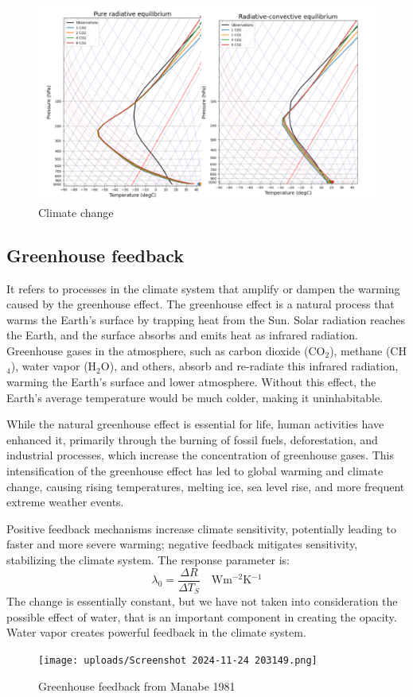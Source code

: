 \begin{figure}[htpb]
	\centering
	\includegraphics[width=0.5\linewidth]{upload/Screenshot 2024-11-24 202614.png}
	\caption{Climate change}

\end{figure}
\subsection{Greenhouse feedback}
It refers to processes in the climate system that amplify or dampen the warming caused by the greenhouse effect.  The greenhouse effect is a natural process that warms the Earth’s surface by trapping heat from the Sun. Solar radiation reaches the Earth, and the surface absorbs and emits heat as infrared radiation. Greenhouse gases in the atmosphere, such as carbon dioxide (CO$_2$), methane (CH$_4$), water vapor (H$_2$O), and others, absorb and re-radiate this infrared radiation, warming the Earth's surface and lower atmosphere. Without this effect, the Earth's average temperature would be much colder, making it uninhabitable.

While the natural greenhouse effect is essential for life, human activities have enhanced it, primarily through the burning of fossil fuels, deforestation, and industrial processes, which increase the concentration of greenhouse gases. This intensification of the greenhouse effect has led to global warming and climate change, causing rising temperatures, melting ice, sea level rise, and more frequent extreme weather events.

Positive feedback mechanisms increase climate sensitivity, potentially leading to faster and more severe warming; negative feedback mitigates sensitivity, stabilizing the climate system.
The response parameter is:
\begin{equation}
	\lambda_0=\frac{\Delta R}{\Delta T_S}\quad \text{Wm$^{-2}$K$^{-1}$}
\end{equation}
The change is essentially constant, but we have not taken into consideration the possible effect of water, that is an important component in creating the opacity. Water vapor creates powerful feedback in the climate system.
\begin{figure}[htpb]
	\centering
	\texttt{[image: uploads/Screenshot 2024-11-24 203149.png]}
	\caption{Greenhouse feedback from Manabe 1981}

\end{figure}
